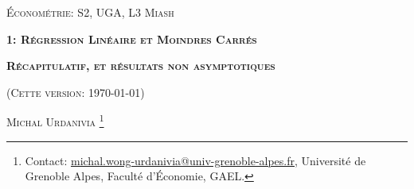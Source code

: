 

\usepackage{tikz}
\usepackage{enumitem}


\usepackage{fancyhdr}
\pagestyle{fancy}
\fancyhead{}
\fancyfoot{} 
\fancyfoot[C]{\small{\thepage}}
\renewcommand{\footrulewidth}{0pt}



 
\usetikzlibrary{positioning}
\usetikzlibrary{snakes}
\usetikzlibrary{calc}
\usetikzlibrary{arrows}
\usetikzlibrary{decorations.markings}
\usetikzlibrary{shapes.misc}
\usetikzlibrary{shapes}

\begin{titlepage}
\centering
	{\scshape\Large \textsc{Économétrie: S2, UGA, L3 Miash}\par}
	\vspace{1cm}
	{\Large\bfseries \textsc{1: Régression Linéaire et Moindres Carrés} \par}
    \vspace{1cm}   
	{\Large\bfseries \textsc{Récapitulatif, et résultats non asymptotiques} \par}
	\vspace{1cm}
	{(\textsc{Cette version: \today})\par}
	\vspace{1cm}
	{\large \textsc{Michal Urdanivia}
	\footnote{Contact:  
	\href{mailto:michal.wong-urdanivia@univ-grenoble-alpes.fr}{michal.wong-urdanivia@univ-grenoble-alpes.fr}, 
	 Université de Grenoble Alpes,  Faculté d'\'Economie, GAEL.}\par}
	
\end{titlepage}


